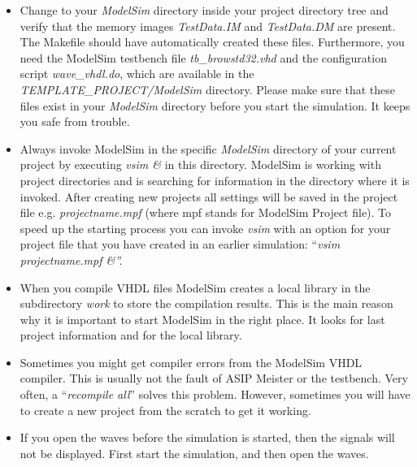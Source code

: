 \documentclass[
]{article}
\begin{document}
\begin{itemize}
\item
  Change to your \emph{ModelSim} directory inside your project directory
  tree and verify that the memory images \emph{TestData.IM} and
  \emph{TestData.DM} are present. The Makefile should have automatically
  created these files. Furthermore, you need the ModelSim testbench file
  \emph{tb\_browstd32.vhd} and the configuration script
  \emph{wave\_vhdl.do}, which are available in the
  \emph{TEMPLATE\_PROJECT/ModelSim} directory. Please make sure that
  these files exist in your \emph{ModelSim} directory before you start
  the simulation. It keeps you safe from trouble.
\item
  Always invoke ModelSim in the specific \emph{ModelSim} directory of
  your current project by executing \emph{vsim \&} in this directory.
  ModelSim is working with project directories and is searching for
  information in the directory where it is invoked. After creating new
  projects all settings will be saved in the project file e.g.
  \emph{projectname.mpf} (where mpf stands for ModelSim Project file).
  To speed up the starting process you can invoke \emph{vsim} with an
  option for your project file that you have created in an earlier
  simulation: ``\emph{vsim projectname.mpf \&''.}
\item
  When you compile VHDL files ModelSim creates a local library in the
  subdirectory \emph{work} to store the compilation results. This is the
  main reason why it is important to start ModelSim in the right place.
  It looks for last project information and for the local library.
\item
  Sometimes you might get compiler errors from the ModelSim VHDL
  compiler. This is usually not the fault of ASIP Meister or the
  testbench. Very often, a ``\emph{recompile all}'' solves this problem.
  However, sometimes you will have to create a new project from the
  scratch to get it working.
\item
  If you open the waves before the simulation is started, then the
  signals will not be displayed. First start the simulation, and then
  open the waves.
\end{itemize}
\end{document}
